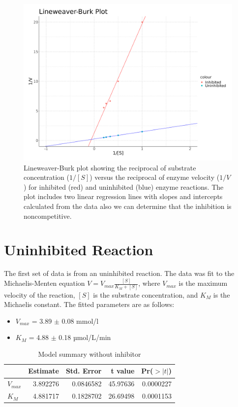 \documentclass{article}
\begin{document}
\begin{figure}[H]
    \centering
    \includegraphics[width=1.0\textwidth, height=0.5\textheight]{plots/Lineweaver-Burk_big.png}
    \caption{Lineweaver-Burk plot showing the reciprocal of substrate concentration
    ($1/[S]$) versus the reciprocal of enzyme velocity ($1/V$) for inhibited (red) and
    uninhibited (blue) enzyme reactions. The plot includes two linear regression lines with
    slopes and intercepts calculated from the data also we can determine that the inhibition 
    is noncompetitive.}

    \label{fig:lineweaver-burk}
\end{figure}

\section{Uninhibited Reaction}

The first set of data is from an uninhibited reaction. The data was fit to the
Michaelis-Menten equation $V = V_{max} \displaystyle \frac{[S]}{K_{M} + [S]}$, where $V_{max}$ is the
maximum velocity of the reaction, $[S]$ is the substrate concentration, and $K_{M}$ is the
Michaelis constant. The fitted parameters are as follows:
\begin{itemize}
    \item $V_{max}$ = 3.89 $\pm$ 0.08 mmol/l
    \item $K_{M}$ = 4.88 $\pm$ 0.18 µmol/L/min
\end{itemize}

\begin{table}[H]
    \caption{Model summary without inhibitor}
    \centering
    \begin{tabular}[t]{l|r|r|r|r}
        \hline
                  & Estimate & Std. Error & t value  & Pr($>|t|$) \\
        \hline
        $V_{max}$ & 3.892276 & 0.0846582  & 45.97636 & 0.0000227  \\
        \hline
        $K_{M}$   & 4.881717 & 0.1828702  & 26.69498 & 0.0001153  \\
        \hline
    \end{tabular}
\end{table}
\end{document}
